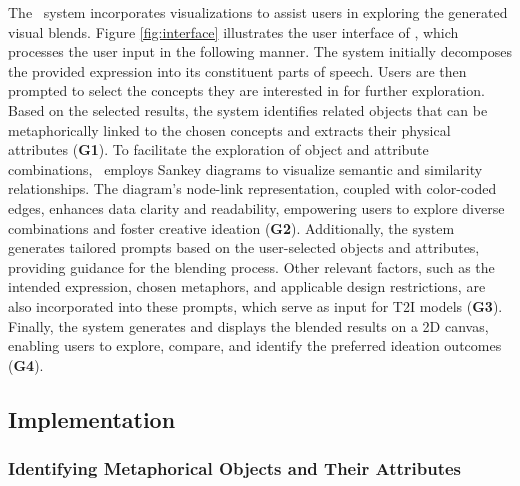 The \sysname\ system incorporates visualizations to assist users in exploring the generated visual blends.
Figure \ref{fig:interface} illustrates the user interface of \sysname, which processes the user input in the following manner.
The system initially decomposes the provided expression into its constituent parts of speech. Users are then prompted to select the concepts they are interested in for further exploration. Based on the selected results, the system identifies related objects that can be metaphorically linked to the chosen concepts and extracts their physical attributes (\textbf{G1}).
To facilitate the exploration of object and attribute combinations, \sysname\ employs Sankey diagrams to visualize semantic and similarity relationships.
The diagram's node-link representation, coupled with color-coded edges, enhances data clarity and readability, empowering users to explore diverse combinations and foster creative ideation (\textbf{G2}).
Additionally, the system generates tailored prompts based on the user-selected objects and attributes, providing guidance for the blending process. Other relevant factors, such as the intended expression, chosen metaphors, and applicable design restrictions, are also incorporated into these prompts, which serve as input for T2I models (\textbf{G3}).
Finally, the system generates and displays the blended results on a 2D canvas, enabling users to explore, compare, and identify the preferred ideation outcomes (\textbf{G4}).



\subsection{Implementation}



\subsubsection{Identifying Metaphorical Objects and Their Attributes}



